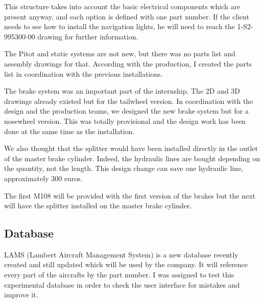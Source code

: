 \documentclass[11pt,a4paper]{article}
\begin{document}
This structure takes into account the basic electrical components which are present anyway, and each option is defined with one part number. If the client needs to see how to install the navigation lights, he will need to reach the 1-S2-995300-00 drawing for further information.


\bigskip

The Pitot and static systems are not new, but there was no parts list and assembly drawings for that. According with the production, I created the parts list in coordination with the previous installations.

The brake system was an important part of the internship. The 2D and 3D drawings already existed but for the tailwheel version.
In coordination with the design and the production teams, we designed the new brake system but for a nosewheel version. This was totally provisional and the design work has been done at the same time as the installation.

We also thought that the splitter would have been installed directly in the outlet of the master brake cylinder. Indeed, the hydraulic lines are bought depending on the quantity, not the length. This design change can save one hydraulic line, approximately 300 euros.

The first M108 will be provided with the first version of the brakes but the next will have the splitter installed on the master brake cylinder.

\subsection{Database}
LAMS (Lambert Aircraft Management System) is a new database recently created and still updated which will be used by the company. It will reference every part of the aircrafts by the part number.
I was assigned to test this experimental database in order to check the user interface for mistakes and improve it.
\end{document}
